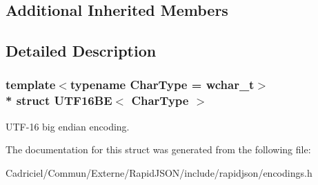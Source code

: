 \subsection*{Additional Inherited Members}


\subsection{Detailed Description}
\subsubsection*{template$<$typename Char\+Type = wchar\+\_\+t$>$\\*
struct U\+T\+F16\+B\+E$<$ Char\+Type $>$}

U\+T\+F-\/16 big endian encoding. 

The documentation for this struct was generated from the following file\+:\begin{DoxyCompactItemize}
\item 
Cadriciel/\+Commun/\+Externe/\+Rapid\+J\+S\+O\+N/include/rapidjson/encodings.\+h\end{DoxyCompactItemize}
